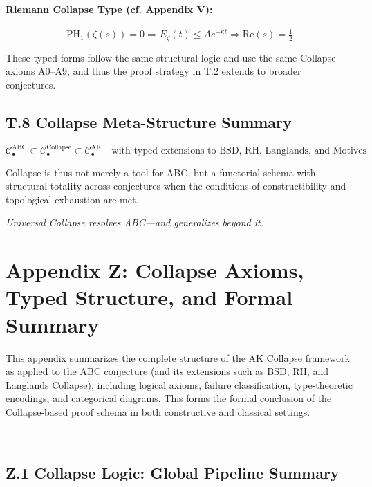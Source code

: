 \documentclass[11pt]{article}
\begin{document}
\paragraph{Riemann Collapse Type (cf. Appendix V):}
\[
\mathrm{PH}_1(\zeta(s)) = 0 \Rightarrow E_\zeta(t) \leq A e^{-\kappa t} \Rightarrow \mathrm{Re}(s) = \tfrac{1}{2}
\]

These typed forms follow the same structural logic and use the same Collapse axioms A0–A9,  
and thus the proof strategy in T.2 extends to broader conjectures.

\subsection*{T.8 Collapse Meta-Structure Summary}

\[
\mathcal{C}_\bullet^{\mathrm{ABC}} \subset \mathcal{C}_\bullet^{\mathrm{Collapse}} \subset \mathcal{C}_\bullet^{\mathrm{AK}}
\quad\text{with typed extensions to BSD, RH, Langlands, and Motives}
\]

Collapse is thus not merely a tool for ABC, but a functorial schema with structural totality  
across conjectures when the conditions of constructibility and topological exhaustion are met.

\begin{center}
\textit{Universal Collapse resolves ABC—and generalizes beyond it.}
\end{center}




\section*{Appendix Z: Collapse Axioms, Typed Structure, and Formal Summary}

This appendix summarizes the complete structure of the AK Collapse framework as applied to the ABC conjecture  
(and its extensions such as BSD, RH, and Langlands Collapse), including logical axioms, failure classification,  
type-theoretic encodings, and categorical diagrams. This forms the formal conclusion of the Collapse-based proof  
schema in both constructive and classical settings.

---

\subsection*{Z.1 Collapse Logic: Global Pipeline Summary}
\end{document}
